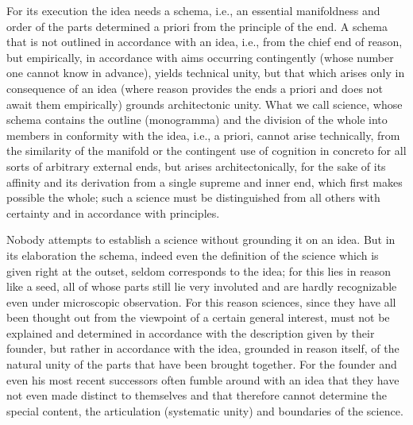 \documentclass{article}
\begin{document}
For its execution the idea needs a schema, i.e.,
an essential manifoldness and order of the parts
determined a priori from the principle of the end.
A schema that is not outlined in accordance with an idea, 
i.e., from the chief end of reason, but empirically,
in accordance with aims occurring contingently
(whose number one cannot know in advance),
yields technical unity,
but that which arises only in consequence of an idea 
(where reason provides the ends a priori
and does not await them empirically) 
grounds architectonic unity.
What we call science,
whose schema contains the outline (monogramma) 
and the division of the whole into members
in conformity with the idea,
i.e., a priori, cannot arise technically,
from the similarity of the manifold 
or the contingent use of cognition in concreto 
for all sorts of arbitrary external ends,
but arises architectonically,
for the sake of its affinity and its derivation
from a single supreme and inner end,
which first makes possible the whole;
such a science must be distinguished from all others
with certainty and in accordance with principles.

Nobody attempts to establish a science
without grounding it on an idea.
But in its elaboration the schema,
indeed even the definition of the science 
which is given right at the outset, 
seldom corresponds to the idea;
for this lies in reason like a seed,
all of whose parts still lie very involuted
and are hardly recognizable even under microscopic observation.
For this reason sciences, since they have all been thought out from
the viewpoint of a certain general interest, must not be explained and
determined in accordance with the description given by their founder,
but rather in accordance with the idea, grounded in reason itself, of the
natural unity of the parts that have been brought together.
For the founder and even his most recent successors often fumble around with
an idea that they have not even made distinct to themselves
and that therefore cannot determine the special content,
the articulation (systematic unity) and boundaries of the science.
\end{document}
